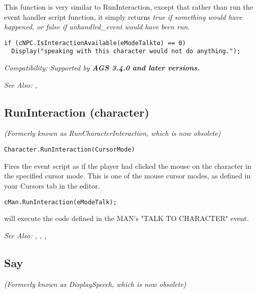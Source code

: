 This function is very similar to RunInteraction, except that rather than run the event
handler script function, it simply returns \it{true} if something would have happened,
or \it{false} if unhandled_event would have been run.

\begin{verbatim}
if (cNPC.IsInteractionAvailable(eModeTalkto) == 0)
  Display("speaking with this character would not do anything.");
\end{verbatim}

\it{Compatibility:} Supported by \bf{AGS 3.4.0} and later versions.

\it{See Also:} ,


\subsection{RunInteraction (character)}\label{Character.RunInteraction}%

\it{(Formerly known as RunCharacterInteraction, which is now obsolete)}

\begin{verbatim}
Character.RunInteraction(CursorMode)
\end{verbatim}
Fires the event script as if the player had clicked the mouse on the character
in the specified cursor mode. This is one of the mouse cursor
modes, as defined in your Cursors tab in the editor.

\begin{verbatim}
cMan.RunInteraction(eModeTalk);
\end{verbatim}
will execute the code defined in the MAN's "TALK TO CHARACTER" event.

\it{See Also:} ,
,
,


\subsection{Say}\label{Character.Say}%

\it{(Formerly known as DisplaySpeech, which is now obsolete)}

